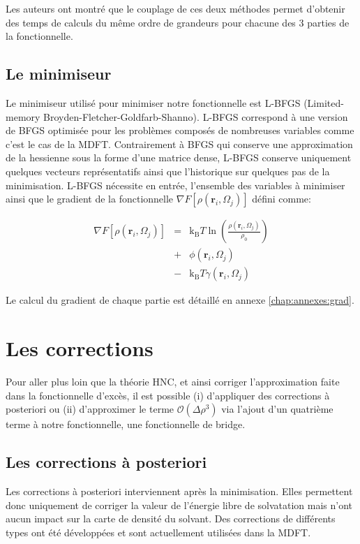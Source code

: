 Les auteurs\cite{ding_thesis} ont montré que le couplage de ces deux méthodes permet d'obtenir des temps de calculs du même ordre de grandeurs pour chacune des 3 parties de la fonctionnelle. 


\subsection{Le minimiseur}
Le minimiseur utilisé pour minimiser notre fonctionnelle est L-BFGS (Limited-memory Broyden-Fletcher-Goldfarb-Shanno)\cite{Byrd_lbfgs_1995}. L-BFGS correspond à une version de BFGS\cite{bfgs_2006} optimisée pour les problèmes composés de nombreuses variables comme c'est le cas de la MDFT. Contrairement à BFGS qui conserve une approximation de la hessienne sous la forme d'une matrice dense, L-BFGS conserve uniquement quelques vecteurs représentatifs ainsi que l'historique sur quelques pas de la minimisation. L-BFGS nécessite en entrée, l'ensemble des variables à minimiser ainsi que le gradient de la fonctionnelle $\nabla F[\rho\left(\boldsymbol{r}_i,\Omega_j\right)]$ défini comme:


\begin{eqnarray}
\nabla F[\rho(\boldsymbol{r}_i,\Omega_j)] &=& \mathrm{k_B}T \ln(\frac{\rho(\boldsymbol{r}_i,\Omega_j)}{\rho_0}) \\
&+& \phi(\boldsymbol{r}_i,\Omega_j ) \nonumber \\
&-& \mathrm{k_B}T \gamma(\boldsymbol{r}_i,\Omega_j) \nonumber
\end{eqnarray}

Le calcul du gradient de chaque partie est détaillé en annexe \ref{chap:annexes:grad}.

\section{Les corrections}
Pour aller plus loin que la théorie HNC, et ainsi corriger l'approximation faite dans la fonctionnelle d'excès, il est possible (i) d'appliquer des corrections à posteriori ou (ii) d'approximer le terme $\mathcal{O}(\Delta\rho^{3})$ via l'ajout d'un quatrième terme à notre fonctionnelle, une fonctionnelle de bridge.


\subsection{Les corrections à posteriori}
Les corrections à posteriori interviennent après la minimisation. Elles permettent donc uniquement de corriger la valeur de l'énergie libre de solvatation mais n'ont aucun impact sur la carte de densité du solvant. Des corrections de différents types ont été développées et sont actuellement utilisées dans la MDFT.


